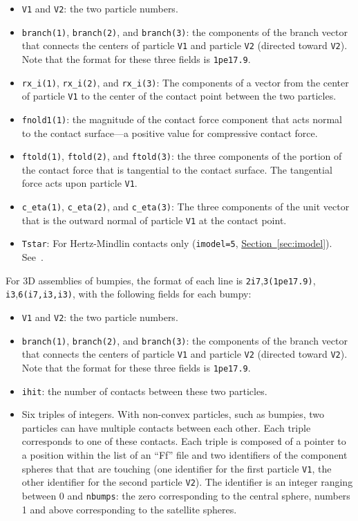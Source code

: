 \documentclass[letterpaper,11pt]{article}
\begin{document}
\begin{itemize}
\item
\texttt{V1} and \texttt{V2}:
the two particle numbers.
\item
\texttt{branch(1)}, \texttt{branch(2)}, and \texttt{branch(3)}:
the components of the branch vector that
connects the centers of particle \texttt{V1} and particle \texttt{V2}
(directed toward \texttt{V2}).  Note that the format for these three fields
is \texttt{1pe17.9}.
\item
\texttt{rx\_i(1)}, \texttt{rx\_i(2)}, and \texttt{rx\_i(3)}:
The components of a vector from the center of particle \texttt{V1}
to the center of the contact point between the two particles.
\item
\texttt{fnold1(1)}:
the magnitude of the contact force
component that acts normal to the contact surface---a
positive value for compressive contact force.
\item
\texttt{ftold(1)}, \texttt{ftold(2)}, and \texttt{ftold(3)}:
the three components of the portion of the contact force
that is tangential to the contact surface.
The tangential force acts upon particle \texttt{V1}.
\item
\texttt{c\_eta(1)}, \texttt{c\_eta(2)}, and \texttt{c\_eta(3)}:
The three components of the unit vector that is the outward normal
of particle \texttt{V1} at the contact point.
\item
\texttt{Tstar}:
For Hertz-Mindlin contacts only (\texttt{imodel=5},
\hyperref[sec:imodel]{Section~\ref*{sec:imodel}}). 
See~\citep{Thornton:1988a}.
\end{itemize}
%
\par
For 3D assemblies of bumpies,
the format of each line is \texttt{2i7},\texttt{3(1pe17.9)},
\texttt{i3},\texttt{6(i7,i3,i3)}, with
the following fields for each bumpy:
\begin{itemize}
\item
\texttt{V1} and \texttt{V2}:
the two particle numbers.
\item
\texttt{branch(1)}, \texttt{branch(2)}, and \texttt{branch(3)}:
the components of the branch vector that
connects the centers of particle \texttt{V1} and particle \texttt{V2}
(directed toward \texttt{V2}).  Note that the format for these three fields
is \texttt{1pe17.9}.
\item
\texttt{ihit}: the number of contacts between these two particles.
\item
Six triples of integers.  With non-convex particles, such as bumpies,
two particles can have multiple contacts between each other.
Each triple corresponds to one of these contacts.
Each triple is composed of a pointer to
a position within the list of an ``Ff'' file and two identifiers 
of the component spheres that that are touching (one identifier for
the first particle \texttt{V1}, the other identifier for the
second particle \texttt{V2}).
The identifier is an integer ranging between 0 and \texttt{nbumps}:
the zero corresponding to the central sphere, numbers 1 and above 
corresponding to the satellite spheres.
\end{itemize}
%
\end{document}
